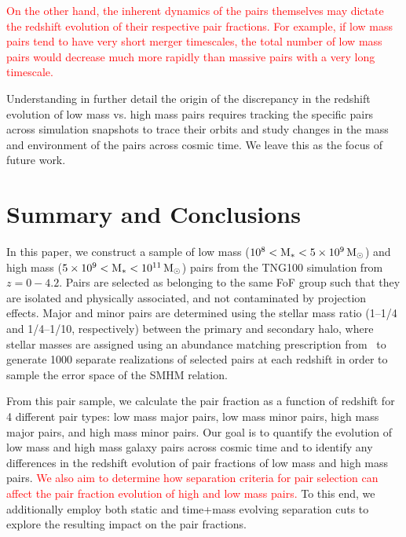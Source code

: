 \documentclass[twocolumn]{aastex631}
\newcommand{\add}[1]{\textcolor{red}{#1}}
\begin{document}
    \add{On the other hand, the inherent dynamics of the pairs themselves may dictate the redshift evolution of their respective pair fractions.}
    \add{For example, if low mass pairs tend to have very short merger timescales, the total number of low mass pairs would decrease much more rapidly than massive pairs with a very long timescale.}
    
    Understanding in further detail the origin of the discrepancy in the redshift evolution of low mass vs. high mass pairs requires tracking the specific pairs across simulation snapshots to trace their orbits and study changes in the mass and environment of the pairs across cosmic time.  
    We leave this as the focus of future work.

\section{Summary and Conclusions}\label{sec:summary}
In this paper, we construct a sample of low mass ($\rm 10^8<M_*<5\times10^9\,\mathrm{M}_\odot$) and high mass ($\rm 5\times10^9<M_*<10^{11}\,\mathrm{M}_\odot$) pairs from the TNG100 simulation from $z=0-4.2$. Pairs are selected as belonging to the same FoF group such that they are isolated and physically associated, and not contaminated by projection effects.
Major and minor pairs are determined using the stellar mass ratio (1--1/4 and 1/4--1/10, respectively) between the primary and secondary halo, where stellar masses are assigned using an abundance matching prescription from~\cite{Moster2013} to generate 1000 separate realizations of selected pairs at each redshift in order to sample the error space of the SMHM relation.

From this pair sample, we calculate the pair fraction as a function of redshift for 4 different pair types: low mass major pairs, low mass minor pairs, high mass major pairs, and high mass minor pairs. 
Our goal is to quantify the evolution of low mass and high mass galaxy pairs across cosmic time and to identify any differences in the redshift evolution of pair fractions of low mass and high mass pairs.
\add{We also aim to determine how separation criteria for pair selection can affect the pair fraction evolution of high and low mass pairs.}
To this end, we additionally employ both static and time+mass evolving separation cuts to explore the resulting impact on the pair fractions.
\end{document}
